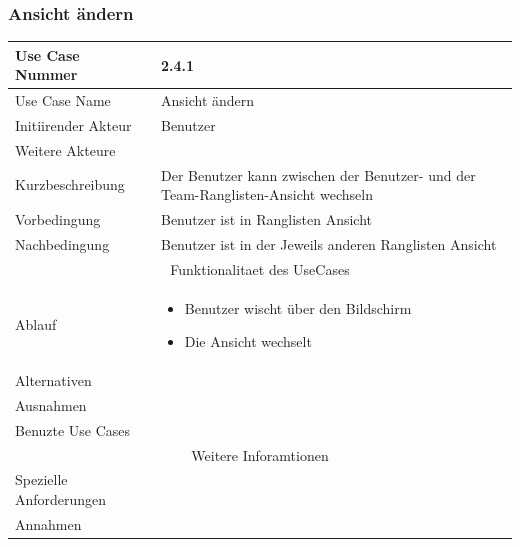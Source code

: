 \documentclass[10pt,a4paper]{article}
\begin{document}
\subsubsection{Ansicht \"andern}
		\begin{tabular}{|l|p{.5\linewidth}|}
		\hline Use Case Nummer & 2.4.1 \\ 
		\hline Use Case Name & Ansicht \"andern \\ 
		\hline Initiirender Akteur & Benutzer \\
		\hline Weitere Akteure &  \\
		\hline Kurzbeschreibung & Der Benutzer kann zwischen der Benutzer- und der Team-Ranglisten-Ansicht wechseln \\
		\hline Vorbedingung & Benutzer ist in Ranglisten Ansicht \\
		\hline Nachbedingung & Benutzer ist in der Jeweils anderen Ranglisten Ansicht \\
		\hline \multicolumn{2}{|c|}{Funktionalitaet des UseCases}\\
		\hline Ablauf & \begin{itemize}
			\item Benutzer wischt \"uber den Bildschirm
			\item Die Ansicht wechselt
		\end{itemize} \\
		\hline Alternativen &  \\
		\hline Ausnahmen &  \\
		\hline Benuzte Use Cases &  \\
		\hline \multicolumn{2}{|c|}{Weitere Inforamtionen} \\
		\hline Spezielle Anforderungen &  \\
		\hline Annahmen &  \\
		\hline
		\end{tabular}
		
\end{document}
